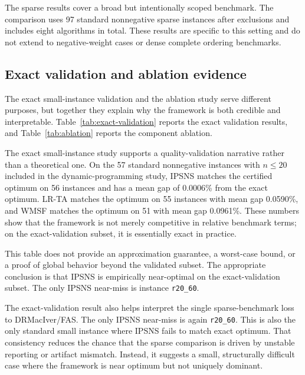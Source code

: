 

The sparse results cover a broad but intentionally scoped benchmark. The comparison uses 97 standard nonnegative sparse instances after exclusions and includes eight algorithms in total. These results are specific to this setting and do not extend to negative-weight cases or dense complete ordering benchmarks.

\subsection{Exact validation and ablation evidence}

The exact small-instance validation and the ablation study serve different purposes, but together they explain why the framework is both credible and interpretable. Table~\ref{tab:exact-validation} reports the exact validation results, and Table~\ref{tab:ablation} reports the component ablation.





The exact small-instance study supports a quality-validation narrative rather than a theoretical one. On the 57 standard nonnegative instances with \(n \le 20\) included in the dynamic-programming study, IPSNS matches the certified optimum on 56 instances and has a mean gap of 0.0006\% from the exact optimum. LR-TA matches the optimum on 55 instances with mean gap 0.0590\%, and WMSF matches the optimum on 51 with mean gap 0.0961\%. These numbers show that the framework is not merely competitive in relative benchmark terms; on the exact-validation subset, it is essentially exact in practice.

This table does not provide an approximation guarantee, a worst-case bound, or a proof of global behavior beyond the validated subset. The appropriate conclusion is that IPSNS is empirically near-optimal on the exact-validation subset. The only IPSNS near-miss is instance \texttt{r20\_60}.

The exact-validation result also helps interpret the single sparse-benchmark loss to DRMacIver/FAS. The only IPSNS near-miss is again \texttt{r20\_60}. This is also the only standard small instance where IPSNS fails to match exact optimum. That consistency reduces the chance that the sparse comparison is driven by unstable reporting or artifact mismatch. Instead, it suggests a small, structurally difficult case where the framework is near optimum but not uniquely dominant.

